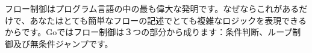 フロー制御はプログラム言語の中の最も偉大な発明です。なぜならこれがあるだけで、あなたはとても簡単なフローの記述でとても複雑なロジックを表現できるからです。Goではフロー制御は３つの部分から成ります：条件判断、ループ制御及び無条件ジャンプです。
